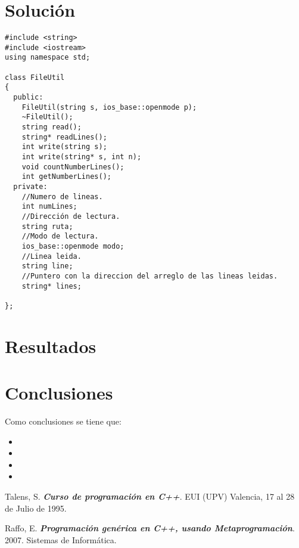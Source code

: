 \section{Solución}


\begin{verbatim}
#include <string>
#include <iostream>
using namespace std;

class FileUtil
{
  public:
  	FileUtil(string s, ios_base::openmode p);
  	~FileUtil();
  	string read();
  	string* readLines();
  	int write(string s);
  	int write(string* s, int n);
    void countNumberLines();
    int getNumberLines();
  private:
    //Numero de lineas.
    int numLines;
    //Dirección de lectura.
    string ruta;
    //Modo de lectura.
  	ios_base::openmode modo;
    //Linea leida.
    string line;
    //Puntero con la direccion del arreglo de las lineas leidas.
    string* lines;

};
\end{verbatim}



\section{Resultados}



\section{Conclusiones}


Como conclusiones se tiene que:

\begin{itemize}
\item 
\item 
\item 
\item 
\end{itemize}


\begin{thebibliography}{IEEE}
 Talens, S. \textbf{\textit{Curso de programación en C++}}. EUI (UPV) Valencia, 17 al 28 de Julio de 1995. 

 Raffo, E. \textbf{\textit{Programación genérica en C++, usando Metaprogramación}}. 2007. Sistemas de Informática. 
\end{thebibliography}

